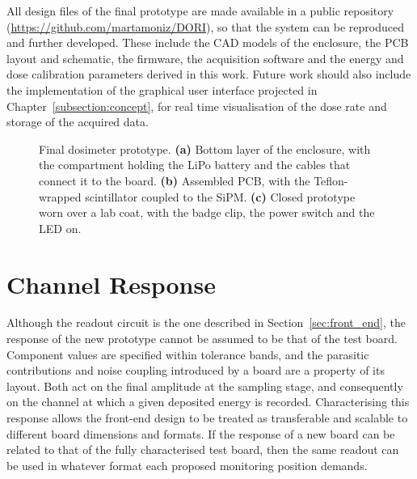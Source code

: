 All design files of the final prototype are made available in a public repository (\url{https://github.com/martamoniz/DORI}), so that the system can be reproduced and further developed. These include the CAD models of the enclosure, the PCB layout and schematic, the firmware, the acquisition software and the energy and dose calibration parameters derived in this work. Future work should also include the implementation of the graphical user interface projected in Chapter~\ref{subsection:concept}, for real time visualisation of the dose rate and storage of the acquired data.

\begin{figure}[H]
  \centering
  \resizebox{1\linewidth}{!}{}
  \caption[Final dosimeter prototype.]{Final dosimeter prototype. \textbf{(a)} Bottom layer of
the enclosure, with the compartment holding the LiPo battery and the cables that
connect it to the board. \textbf{(b)} Assembled PCB, with
the Teflon-wrapped scintillator coupled to the SiPM. \textbf{(c)} Closed prototype
worn over a lab coat, with the badge clip, the power switch and the LED on.}
  \label{fig:prototype}
\end{figure}

\section{Channel Response}
\label{sec:channel_response}

Although the readout circuit is the one described in Section~\ref{sec:front_end}, the response of the new prototype cannot be assumed to be that of the test board. Component values are specified within tolerance bands, and the parasitic contributions and noise coupling introduced by a board are a property of its layout. Both act on the final amplitude at the sampling stage, and consequently on the channel at which a given deposited energy is recorded. Characterising this response allows the front-end design to be treated as transferable and scalable to different board dimensions and formats. If the response of a new board can be related to that of the fully characterised test board, then the same readout can be used in whatever format each proposed monitoring position demands. 

